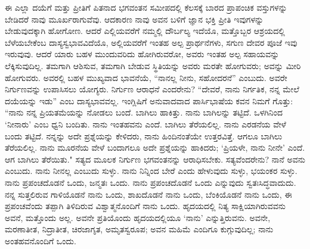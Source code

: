 ಈ ಎಲ್ಲಾ ದಯೆಗೆ ಮತ್ತು ಪ್ರೀತಿಗೆ ಪಿತನಾದ ಭಗವಂತನ ಸಮೀಪದಲ್ಲಿ ಕೆಲಸಕ್ಕೆ ಬಾರದ ಪ್ರಾಪಂಚಿಕ ವಸ್ತುಗಳನ್ನು ಬೇಡಿದರೆ ನಾವು ಮೂರ್ಖರಾಗುವೆವು. ಆದಕಾರಣ ನಾವು ಅವನ ಬಳಿಗೆ ಜ್ಞಾನ ಭಕ್ತಿ ಪ್ರೀತಿ ಇವುಗಳನ್ನು ಬೇಡುವುದಕ್ಕಾಗಿ ಹೋಗೋಣ. ಆದರೆ ಎಲ್ಲಿಯವರೆಗೆ ನಮ್ಮಲ್ಲಿ ದೌರ್ಬಲ್ಯ ಇದೆಯೊ, ಮತ್ತೊಬ್ಬರ ಆಶ್ರಯದಲ್ಲಿ ಬೆಳೆಯಬೇಕೆಂಬ ದಾಸ್ಯಸ್ವಭಾವವಿದೆಯೊ, ಅಲ್ಲಿಯವರೆಗೆ ಇಂತಹ ಅಲ್ಪ ಪ್ರಾರ್ಥನೆಗಳು, ಸಗುಣ ದೇವರ ಪೂಜೆ ಇವು ಇರುವುವು. ಆದರೆ ಯಾರು ಬಹಳ ಮುಂದುವರಿದು ಹೋಗಿರುವರೋ, ಅವರು ಇಂತಹ ಅಲ್ಪ ಸಹಾಯವನ್ನು ಲೆಕ್ಕಿಸುವುದಿಲ್ಲ. ತಮಗಾಗಿ ಆಶಿಸುವ, ತಮಗಾಗಿ ಬೇಡುವ ಸ್ಥಿತಿಯನ್ನು ಅವರು ಮರತೇ ಹೋಗುವರು; ಅವನ್ನು ಮೀರಿ ಹೋಗುವರು. ಅವರಲ್ಲಿ ಬಹಳ ಮುಖ್ಯವಾದ ಭಾವನೆಯೆ, “ನಾನಲ್ಲ ನೀನು, ಸಹೋದರನೆ'' ಎಂಬುದು. ಅವರೇ ನಿರ್ಗುಣವನ್ನು ಉಪಾಸಿಸಲು ಯೋಗ್ಯರು. ನಿರ್ಗುಣ ಆರಾಧನೆ ಎಂದರೇನು? “ದೇವರೆ, ನಾನು ನಿರ್ಗತಿಕ, ನನ್ನ ಮೇಲೆ ದಯೆಯನ್ನು ಇಡು'' ಎಂಬ ದಾಸ್ಯಭಾವವಲ್ಲ. ಇಂಗ್ಲಿಷಿಗೆ ಅನುವಾದವಾದ ಪಾರ್ಸಿಭಾಷೆಯ ಕವನ ನಿಮಗೆ ಗೊತ್ತು: “ನಾನು ನನ್ನ ಪ್ರಿಯತಮೆಯನ್ನು ನೋಡಲು ಬಂದೆ. ಬಾಗಿಲು ಹಾಕಿತ್ತು. ನಾನು ಬಾಗಿಲನ್ನು ತಟ್ಟಿದೆ. ಒಳಗಿನಿಂದ `ನೀನಾರು' ಎಂಬ ಧ್ವನಿ ಬಂದಿತು. ನಾನು ಇಂತಹವನು ಎಂದೆ. ಬಾಗಿಲು ತೆರೆಯಲಿಲ್ಲ. ನಾನು ಎರಡನೆಯ ವೇಳೆ ಬಂದು ತಟ್ಟಿದೆ. ನನ್ನನ್ನು ಅದೇ ಪ್ರಶ್ನೆಯನ್ನು ಕೇಳಿದರು, ನಾನು ಹಿಂದಿನಂತೆಯೇ ಉತ್ತರವಿತ್ತೆ. ಆಗಲೂ ಬಾಗಿಲು ತೆರೆಯಲಿಲ್ಲ. ನಾನು ಮೂರನೆಯ ವೇಳೆ ಬಂದಾಗಲೂ ಅದೇ ಪ್ರಶ್ನೆಯನ್ನು ಹಾಕಿದರು; `ಪ್ರಿಯಳೇ, ನಾನು ನೀನೇ' ಎಂದೆ. ಆಗ ಬಾಗಿಲು ತೆರೆಯಿತು." ಸತ್ಯದ ಮೂಲಕ ನಿರ್ಗುಣ ಭಗವಂತನನ್ನು ಆರಾಧಿಸಬೇಕು. ಸತ್ಯವೆಂದರೇನು? ನಾನೆ ಅವನು ಎಂಬುದು. ನಾನು ನೀನಲ್ಲ ಎಂಬುದು ಸುಳ್ಳು. ನಾನು ನಿನ್ನಿಂದ ಬೇರೆ ಎಂದು ಹೇಳುವುದು ಸುಳ್ಳು, ಭಯಂಕರ ಸುಳ್ಳು. ನಾನು ಪ್ರಪಂಚದೊಡನೆ ಒಂದು, ಜನ್ಮತಃ ಒಂದು. ನಾನು ಪ್ರಪಂಚದೊಡನೆ ಒಂದು ಎನ್ನುವುದು ಸ್ವತಃಸಿದ್ಧವಾದುದು. ನನ್ನ ಸುತ್ತಲಿರುವ ಗಾಳಿಯೊಡನೆ ನಾನು ಒಂದು, ಶಾಖದೊಡನೆ ನಾನು ಒಂದು, ಬೆಂಕಿಯೊಡನೆ ನಾನು ಒಂದು, ಈ ಪ್ರಪಂಚವೆಂದು ತಪ್ಪಾಗಿ ತಿಳಿದಿರುವ ವಿಶ್ವಾತ್ಮನೊಂದಿಗೆ ನಾನು ಒಂದು. ಹೃದಯದಲ್ಲಿ ನಿತ್ಯ ಸಾಕ್ಷಿಯಾಗಿರುವವನು ಅವನೆ, ಮತ್ತೊಂದು ಅಲ್ಲ. ಅವನೇ ಪ್ರತಿಯೊಂದು ಹೃದಯದಲ್ಲಿಯೂ `ನಾನು' ಎನ್ನುತ್ತಿರುವನು. ಅವನೇ, ಮರಣಾತೀತ, ನಿದ್ರಾತೀತ, ಚಿರಜಾಗೃತ, ಅಮೃತಸ್ವರೂಪ; ಅವನ ಮಹಿಮೆ ಎಂದಿಗೂ ಕುಗ್ಗುವುದಿಲ್ಲ; ನಾನು ಅಂತಹವನೊಂದಿಗೆ ಒಂದು.

